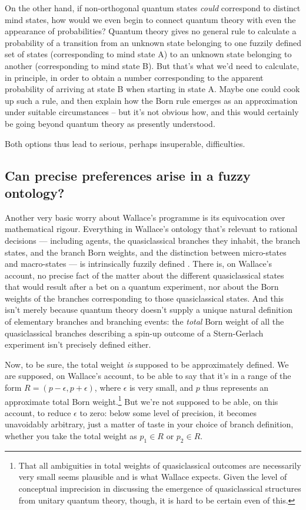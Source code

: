\documentclass[aps,
pra,epsfig,12pt,nofootinbib]{revtex4}
\begin{document}
On the other hand, if non-orthogonal quantum states {\it could} correspond to 
distinct mind states, how would we even begin to 
connect quantum theory with even the appearance of probabilities?   
Quantum theory gives no general rule to calculate a 
probability of a transition from an 
unknown state belonging to one fuzzily defined set of states 
(corresponding to mind state A) to an unknown state belonging to another
(corresponding to mind state B).   But that's what we'd need to calculate,
in principle, in order to obtain a number corresponding to the apparent 
probability of arriving at state B when starting in state A.   
Maybe one could cook up such a rule, and then explain how the Born
rule emerges as an approximation under suitable circumstances -- but
it's not obvious how, and this would certainly be going beyond 
quantum theory as presently understood.  

Both options thus lead to serious, perhaps  
insuperable, difficulties. 

\subsection{Can precise preferences arise in a fuzzy ontology?}

Another very basic worry about Wallace's programme is its 
equivocation over mathematical rigour. 
Everything in Wallace's ontology that's 
relevant to rational decisions --- including agents, 
the quasiclassical branches they inhabit, the branch states, 
and the branch Born weights, and the distinction between micro-states
and macro-states --- is intrinsically fuzzily defined \cite{wallacevolone}.   
There is,
on Wallace's account, no precise fact of the matter about the 
different quasiclassical states that would result after a bet
on a quantum experiment, nor about the Born weights of the branches
corresponding to those quasiclassical states.   And this isn't merely
because quantum theory doesn't supply a unique natural definition of 
elementary branches and branching events: the {\it total} Born 
weight of all the quasiclassical branches describing a spin-up
outcome of a Stern-Gerlach experiment isn't precisely defined either. 

Now, to be sure, the total weight {\it is} supposed to 
be approximately defined.  We are supposed, on Wallace's
account, to be able to say that it's in a range of the 
form $ R = ( p - \epsilon, p + \epsilon )$, where $\epsilon$ is 
very small, and $p$ thus 
represents an approximate total Born weight.\footnote{That
all ambiguities in total weights of quasiclassical outcomes 
are necessarily very small seems plausible and is what Wallace expects.  
Given the level of conceptual imprecision in discussing the emergence
of quasiclassical structures from unitary quantum theory, 
though, it is hard to be certain even of this.}
But we're not supposed to be able, on
this account, to reduce $\epsilon$ to zero: below some level 
of precision, it becomes unavoidably arbitrary, just a matter of taste 
in your choice of branch definition, whether you take  
the total weight as $p_1 \in R$ or $p_2 \in R$. 
\end{document}
